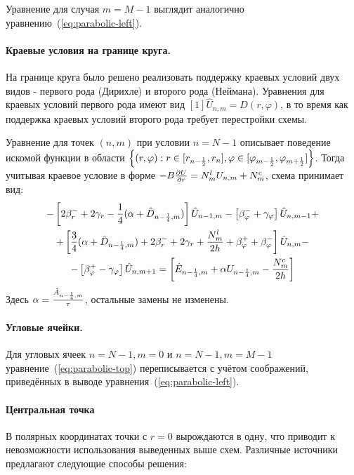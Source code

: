Уравнение для случая $m=M-1$ выглядит аналогично 
уравнению~(\ref{eq:parabolic-left}).

\paragraph{Краевые условия на границе круга.}
На границе круга было решено реализовать поддержку краевых условий двух видов -
первого рода (Дирихле) и второго рода (Неймана).
Уравнения для краевых условий первого рода имеют вид $[1]\hat{U}_{n,m} = D(r, 
\varphi)$, в то время как поддержка краевых условий второго рода требует 
перестройки схемы.

Уравнение для точек $(n,m)$ при условии $n = N-1$ описывает поведение искомой 
функции в области $\left\{(r, \varphi) : r \in [r_{n-\frac{1}{2}}, r_{n}], \varphi 
\in [\varphi_{m-\frac{1}{2}}, \varphi_{m+\frac{1}{2}}]\right\}$.
Тогда учитывая краевое условие в форме $-B\frac{\partial U}{\partial r} = N^l_m 
U_{n,m} + N^c_m$, схема принимает вид:
\begin{gather}
-\left[2\beta_r^- + 2\gamma_r - \frac{1}{4}(\alpha + 
\hat{D}_{n-\frac{1}{4},m})\right] \hat{U}_{n-1,m}
-\left[\beta_\varphi^- + \gamma_\varphi\right] \hat{U}_{n,m-1}
+\nonumber\\+
\left[\frac{3}{4}(\alpha + \hat{D}_{n-\frac{1}{4},m}) + 2\beta_r^- +2\gamma_r 
+\frac{N^l_m}{2h} + \beta_\varphi^+ + \beta_\varphi^-\right] \hat{U}_{n,m}
-\nonumber\\
-\left[\beta_\varphi^+ - \gamma_\varphi\right] \hat{U}_{n,m+1}
=\left[\hat{E}_{n-\frac{1}{4},m} + \alpha U_{n-\frac{1}{4},m} - \frac{N^c_m}{2h}\right]
\label{eq:parabolic-top}
\end{gather}
Здесь $\alpha = \frac{\hat{A}_{n-\frac{1}{4}, m}}{\tau}$, остальные замены не 
изменены.

\paragraph{Угловые ячейки.}
Для угловых ячеек $n=N-1,m=0$ и $n=N-1, m=M-1$ 
уравнение~(\ref{eq:parabolic-top}) переписывается с учётом соображений, 
приведённых в выводе уравнения~(\ref{eq:parabolic-left}).

\paragraph{Центральная точка}
В полярных координатах точки с $r = 0$ вырождаются в одну, что приводит к
невозможности использования выведенных выше схем.
Различные источники~\cite{centerPointTreatmentTotal, centerPointTreatment1, 
centerPointTreatment2} предлагают следующие способы решения:


